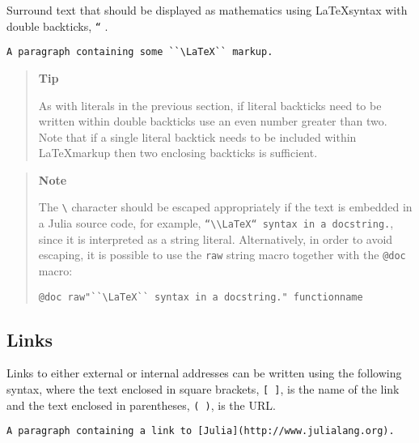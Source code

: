 Surround text that should be displayed as mathematics using \LaTeX syntax with double backticks, \texttt{``} .




\begin{lstlisting}
A paragraph containing some ``\LaTeX`` markup.
\end{lstlisting}



\begin{quote}
\textbf{Tip}

As with literals in the previous section, if literal backticks need to be written within double backticks use an even number greater than two. Note that if a single literal backtick needs to be included within \LaTeX markup then two enclosing backticks is sufficient.

\end{quote}


\begin{quote}
\textbf{Note}

The \texttt{{\textbackslash}} character should be escaped appropriately if the text is embedded in a Julia source code, for example, \texttt{{\textquotedbl}``{\textbackslash}{\textbackslash}LaTeX`` syntax in a docstring.{\textquotedbl}}, since it is interpreted as a string literal. Alternatively, in order to avoid escaping, it is possible to use the \texttt{raw} string macro together with the \texttt{@doc} macro:


\begin{lstlisting}
@doc raw"``\LaTeX`` syntax in a docstring." functionname
\end{lstlisting}

\end{quote}


\hypertarget{10395937766942848638}{}


\subsection{Links}



Links to either external or internal addresses can be written using the following syntax, where the text enclosed in square brackets, \texttt{[ ]}, is the name of the link and the text enclosed in parentheses, \texttt{( )}, is the URL.




\begin{lstlisting}
A paragraph containing a link to [Julia](http://www.julialang.org).
\end{lstlisting}



